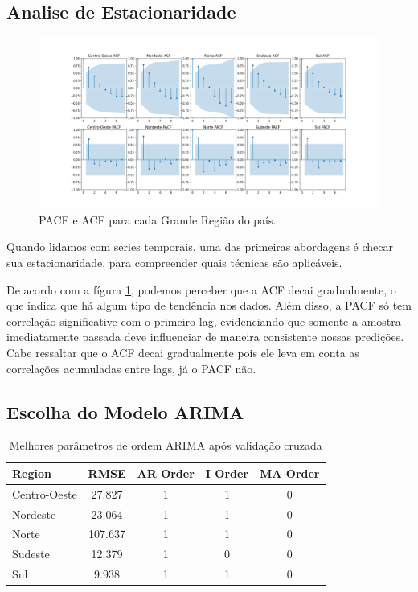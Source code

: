 \documentclass[12pt]{article}
\begin{document}
\subsection{Analise de Estacionaridade} 

\begin{figure}[!htbp]
    \begin{center}
    \includegraphics[width=\textwidth]{../figures/acf_pacf.png}
    \caption{\label{fig:corr} PACF e ACF para cada Grande Região do país.}
    \end{center}
\end{figure}

Quando lidamos com series temporais, uma das primeiras abordagens
é checar sua estacionaridade, para compreender quais técnicas são 
aplicáveis.

De acordo com a fígura \ref{fig:corr}, podemos perceber que a ACF 
decai gradualmente, o que indica que há algum tipo de tendência nos
dados. Além disso, a PACF só tem correlação significative com o primeiro lag,
evidenciando que somente a amostra imediatamente passada deve influenciar de
maneira consistente nossas predições. Cabe ressaltar que o ACF decai gradualmente
pois ele leva em conta as correlações acumuladas entre lags, já o PACF não. 

\subsection{Escolha do Modelo ARIMA}

\begin{table}[h!]
\centering
\caption{Melhores parâmetros de ordem ARIMA após validação cruzada}
\label{tab:arima_performance}
\begin{tabular}{lcccc}
\toprule
\textbf{Region} & \textbf{RMSE} & \textbf{AR Order} & \textbf{I Order} & \textbf{MA Order} \\
\midrule
Centro-Oeste  & 27.827 & 1 & 1 & 0 \\
Nordeste  & 23.064 & 1 & 1 & 0 \\
Norte  & 107.637 & 1 & 1 & 0 \\
Sudeste  & 12.379 & 1 & 0 & 0 \\
Sul  & 9.938 & 1 & 1 & 0 \\
\bottomrule
\end{tabular}
\end{table}
\end{document}
